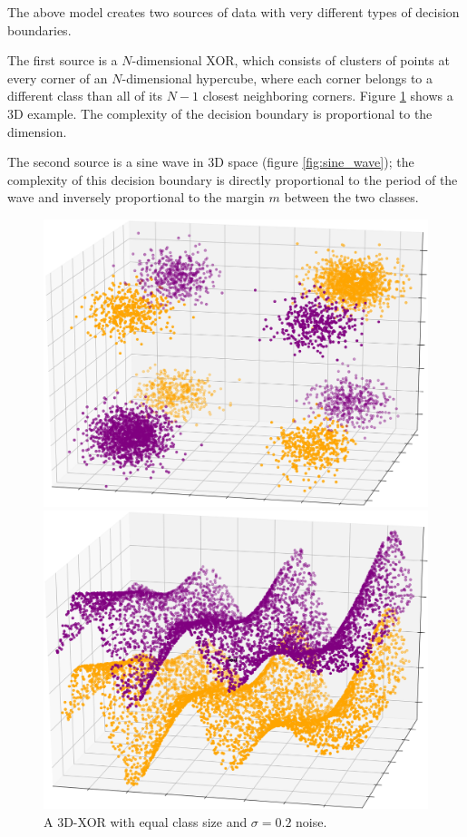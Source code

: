 \documentclass{article}
\begin{document}
The above model creates two sources of data with very different types of
decision boundaries.

The first source is a $N$-dimensional XOR, which consists of clusters of points
at every corner of an $N$-dimensional hypercube, where each corner belongs to a
different class than all of its $N-1$ closest neighboring corners. Figure
\ref{fig:xor} shows a 3D example. The complexity of the decision boundary is
proportional to the dimension.

The second source is a sine wave in 3D space (figure \ref{fig:sine_wave}); the
complexity of this decision boundary is directly proportional to the period of
the wave and inversely proportional to the margin $m$ between the two classes.

\begin{figure}
\begin{minipage}{.5\textwidth}
    \centering
    \includegraphics[width=\textwidth]{xor_3d_square.png}
    \caption{A 3D-XOR with equal class size and $\sigma=0.2$ noise.}
    \label{fig:xor}
\end{minipage}
\begin{minipage}{.5\textwidth}
    \centering
    \includegraphics[width=\textwidth]{sine_wave_square.png}

\end{minipage}
\end{figure}
\end{document}
